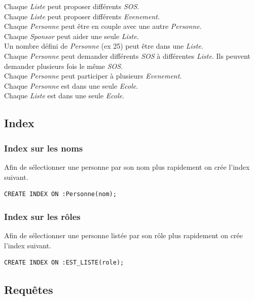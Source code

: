 \documentclass[a4paper,oneside,1pt]{article}
\begin{document}
Chaque \textit{Liste} peut proposer différents \textit{SOS}.  \\
Chaque \textit{Liste} peut proposer différents \textit{Evenement}.  \\
Chaque \textit{Personne} peut être en couple avec une autre \textit{Personne}. \\
Chaque \textit{Sponsor} peut aider une seule \textit{Liste}. \\
Un nombre défini de \textit{Personne} (ex 25) peut être dans une \textit{Liste}. \\
Chaque \textit{Personne} peut demander différents \textit{SOS} à différentes \textit{Liste}. Ils peuvent demander plusieurs fois le même \textit{SOS}. \\
Chaque \textit{Personne} peut participer à plusieurs \textit{Evenement}. \\
Chaque \textit{Personne} est dans une seule \textit{Ecole}. \\
Chaque \textit{Liste} est dans une seule \textit{Ecole}. \\
\subsection{Index}
\subsubsection{Index sur les noms}
Afin de sélectionner une personne par son nom plus rapidement on crée l'index suivant.
\\
\begin{verbatim}
CREATE INDEX ON :Personne(nom);
\end{verbatim}
\subsubsection{Index sur les rôles}
Afin de sélectionner une personne listée par son rôle plus rapidement on crée l'index suivant.
\\
\begin{verbatim}
CREATE INDEX ON :EST_LISTE(role);
\end{verbatim}
\subsection{Requêtes}

\end{document}
